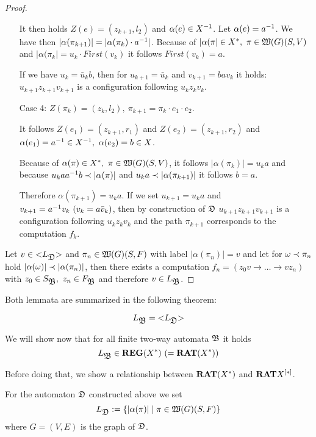 \begin{proof}
\begin{itemize}
  It then holds $Z(e) = (z_{k+1}, l_2)$ and $\alpha(e) \in {{X}^{-1}}$. Let
  $\alpha(e) = {{a}^{-1}}$. We have then $|\alpha(\pi_{k+1})| = |\alpha(\pi_k)
  \cdot {{a}^{-1}}|$. Because of $|\alpha(\pi| \in X^*,\ \pi \in \mbox{$\mathfrak{W}({G})$}(S, V)$
  and $|\alpha(\pi_k| = u_k \cdot First(v_k)$ it follows $First(v_k) = a$.
  
  If we have $u_k = \bar{u}_k b$, then for $u_{k+1} = \bar{u}_k$ and $v_{k+1} =
  b a v_k$ it holds: $u_{k+1} z_{k+1} v_{k+1}$ is a configuration following
  $u_{k} z_{k} v_{k}$.
  
  \item[Case 4:] $Z(\pi_k) = (z_k, l_2),\ \pi_{k+1} = \pi_k \cdot e_1 \cdot
  e_2$.
  
  It follows $Z(e_1) = (z_{k+1}, r_1)$ and $Z(e_2) = (z_{k+1}, r_2)$ and
  $\alpha(e_1) = \inv{a} \in \inv{X},\ \alpha(e_2) = b \in X$.
  
  Because of $\alpha(\pi) \in X^*,\ \pi \in \mbox{$\mathfrak{W}({G})$}(S, V)$, it follows
  $|\alpha(\pi_k)| = u_k a$ and because $u_k a {{a}^{-1}} b \prec |\alpha(\pi)|$
  and $u_k a \prec |\alpha(\pi_{k+1})|$ it follows $b = a$.
  
  Therefore $\alpha(\pi_{k+1}) = u_k a$. If we set $u_{k+1} = u_k a$ and
  $v_{k+1} = {{a}^{-1}} v_k\ (v_k = a \bar{v}_k)$, then by construction of $\mbox{$\mathfrak{D}$}$
  $u_{k+1} z_{k+1} v_{k+1}$ is a configuration following $u_{k} z_{k} v_{k}$ and
  the path $\pi_{k+1}$ corresponds to the computation $f_k$.
\end{itemize}

Let $v \in \mbox{${<}{L_{\mbox{$\mathfrak{D}$}}}{>}$}$ and $\pi_n \in \mbox{$\mathfrak{W}({G})$}(S, F)$ with label
$|\alpha(\pi_n)| = v$ and let for $\omega \prec \pi_n$ hold $|\alpha(\omega)|
\prec |\alpha(\pi_n)|$, then there exists a computation $f_n = (z_0 v \to
\ldots \to v z_n)$ with $z_0 \in S_{\mbox{$\mathfrak{B}$}},\ z_n \in F_{\mbox{$\mathfrak{B}$}}$ and therefore
$v \in L_{\mbox{$\mathfrak{B}$}}$.
\end{proof}

Both lemmata are summarized in the following theorem:

\begin{theorem}
\[ L_{\mbox{$\mathfrak{B}$}} = \mbox{${<}{L_{\mbox{$\mathfrak{D}$}}}{>}$} \]
\end{theorem}

\bigskip
We will show now that for all finite two-way automata $\mbox{$\mathfrak{B}$}$ it holds
\[ L_{\mbox{$\mathfrak{B}$}} \in \mbox{{\bf REG}}(X^*)\ (= \mbox{{\bf RAT}}(X^*)) \]

Before doing that, we show a relationship between $\mbox{{\bf RAT}}(X^*)$ and
$\mbox{{\bf RAT}}{\mbox{${X}^{[*]}$}}$.

For the automaton $\mbox{$\mathfrak{D}$}$ constructed above we set
\[ L_{\mbox{$\mathfrak{D}$}} := \mbox{$\{|\alpha(\pi)| \mid \pi \in \mbox{$\mathfrak{W}({G})$}(S, F)\}$} \]
where $G = (V, E)$ is the graph of $\mbox{$\mathfrak{D}$}$.

